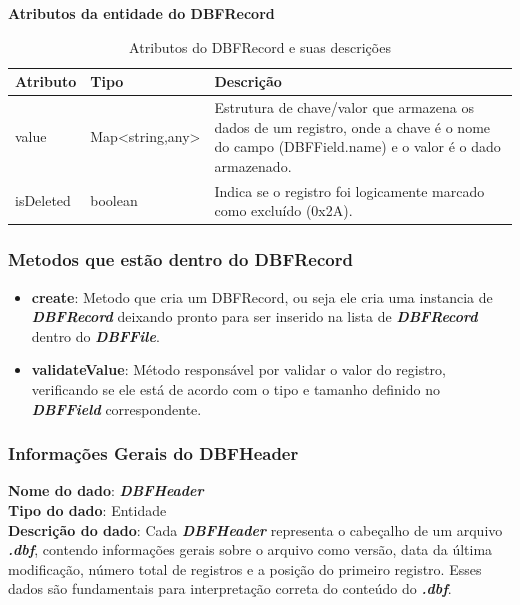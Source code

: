 \begin{table}[H]
    \centering
    \textbf{Atributos da entidade do DBFRecord}
    \begin{tabular}{|p{} | p{} | p{}|}
        \hline
        \textbf{Atributo} & \textbf{Tipo} & \textbf{Descrição} \\
        \hline
        value & Map<string,any> & Estrutura de chave/valor que armazena os dados de um registro, onde a chave é o nome do campo (DBFField.name) e o valor é o dado armazenado. \\
        \hline
        isDeleted & boolean & Indica se o registro foi logicamente marcado como excluído (0x2A). \\
        \hline
    \end{tabular}
    \caption{Atributos do DBFRecord e suas descrições}
    \label{tab:tabela_atributos_dbfrecord}
\end{table}

\subsubsection{Metodos que estão dentro do DBFRecord}
\begin{itemize}
    \item \textbf{create}: Metodo que cria um DBFRecord, ou seja ele cria uma instancia de \textit{\textbf{DBFRecord}} deixando pronto para ser inserido na lista de \textit{\textbf{DBFRecord}} dentro do \textit{\textbf{DBFFile}}.
    \item \textbf{validateValue}: Método responsável por validar o valor do registro, verificando se ele está de acordo com o tipo e tamanho definido no \textit{\textbf{DBFField}} correspondente.
\end{itemize}

\subsubsection{Informações Gerais do DBFHeader}
\textbf{Nome do dado}: \textit{\textbf{DBFHeader}} \\  
\textbf{Tipo do dado}: Entidade \\  
\textbf{Descrição do dado}: Cada \textit{\textbf{DBFHeader}} representa o cabeçalho de um arquivo \textit{\textbf{.dbf}}, contendo informações gerais sobre o arquivo como versão, data da última modificação, número total de registros e a posição do primeiro registro. Esses dados são fundamentais para interpretação correta do conteúdo do \textit{\textbf{.dbf}}. \\  

